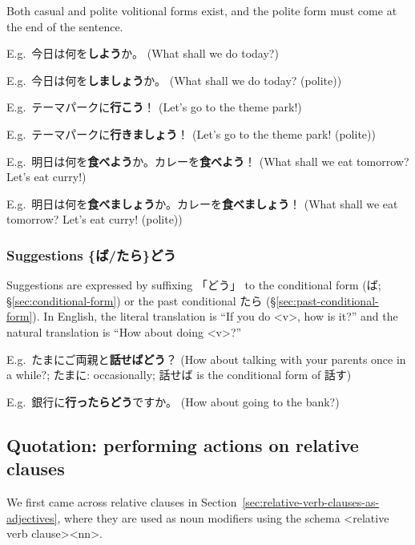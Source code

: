 \documentclass[../nihongo-gakushuu-kyouzai-grammar.tex]{subfiles}
\begin{document}
Both casual and polite volitional forms exist, and the polite form must come at the end of the sentence.


E.g.\ 今日は何を\textbf{しよう}か。 (What shall we do today?)

E.g.\ 今日は何を\textbf{しましょう}か。 (What shall we do today? (polite))

E.g.\ テーマパークに\textbf{行こう}！ (Let's go to the theme park!)

E.g.\ テーマパークに\textbf{行きましょう}！ (Let's go to the theme park! (polite))

E.g.\ 明日は何を\textbf{食べよう}か。カレーを\textbf{食べよう}！ (What shall we eat tomorrow? Let's eat curry!)

E.g.\ 明日は何を\textbf{食べましょう}か。カレーを\textbf{食べましょう}！ (What shall we eat tomorrow? Let's eat curry! (polite))


\subsubsection{Suggestions \{ば/たら\}どう} \label{sec:suggestions}
Suggestions are expressed by suffixing 「どう」 to the conditional form (ば; \S\ref{sec:conditional-form}) or the past conditional たら (\S\ref{sec:past-conditional-form}). In English, the literal translation is ``If you do <v>, how is it?'' and the natural translation is ``How about doing <v>?''


E.g.\ たまにご両親と\textbf{話せばどう}？ (How about talking with your parents once in a while?; たまに: occasionally; 話せば is the conditional form of 話す)

E.g.\ 銀行に\textbf{行ったらどう}ですか。 (How about going to the bank?)


\subsection{Quotation: performing actions on relative clauses}

We first came across relative clauses in Section~\ref{sec:relative-verb-clauses-as-adjectives}, where they are used as noun modifiers using the schema <relative verb clause><nn>.
\end{document}
